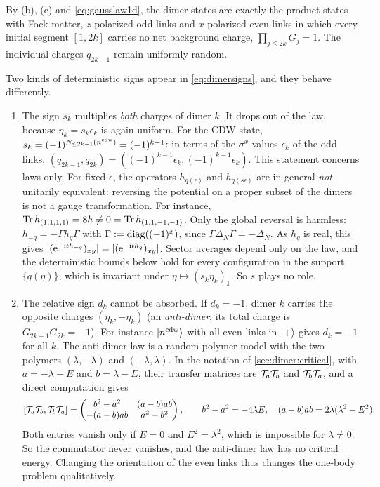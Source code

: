 By (b), (e) and \eqref{eq:gausslaw1d}, the dimer states are exactly the product states with Fock
matter, $z$-polarized odd links and $x$-polarized even links in which every initial segment $[1,2k]$
carries no net background charge, $\prod_{j\le2k}G_j=1$.  The individual charges $q_{2k-1}$ remain
uniformly random.

\begin{remark}\label{rem:dimersigns}
Two kinds of deterministic signs appear in \eqref{eq:dimersigns}, and they behave differently.
\begin{enumerate}[label=(\roman*)]
\item The sign $s_k$ multiplies \emph{both} charges of dimer $k$.  It drops out of the law, because
$\eta_k=s_k\epsilon_k$ is again uniform.  For the CDW state, $s_k=(-1)^{N_{\le2k-1}(n^{\mathrm{cdw}})}=(-1)^{k-1}$:
in terms of the $\sigma^x$-values $\epsilon_k$ of the odd links,
$(q_{2k-1},q_{2k})=((-1)^{k-1}\epsilon_k,(-1)^{k-1}\epsilon_k)$.  This statement concerns laws only.  For
fixed $\epsilon$, the operators $h_{q(\epsilon)}$ and $h_{q(s\epsilon)}$ are in general \emph{not} unitarily
equivalent: reversing the potential on a proper subset of the dimers is not a gauge transformation.
For instance, $\operatorname{Tr} h_{(1,1,1,1)}=8h\neq0=\operatorname{Tr} h_{(1,1,-1,-1)}$.  Only the global reversal is harmless:
$h_{-q}=-\Gamma h_q\Gamma$ with $\Gamma:=\operatorname{diag}((-1)^x)$, since $\Gamma\Delta_N\Gamma=-\Delta_N$.  As $h_q$
is real, this gives $|(\mathrm{e}^{-\mathrm{i} th_{-q}})_{xy}|=|(\mathrm{e}^{-\mathrm{i} th_q})_{xy}|$.  Sector averages depend only on
the law, and the deterministic bounds below hold for every configuration in the support
$\{q(\eta)\}$, which is invariant under $\eta\mapsto(s_k\eta_k)_k$.  So $s$ plays no role.
\item The relative sign $d_k$ cannot be absorbed.  If $d_k=-1$, dimer $k$ carries the opposite charges
$(\eta_k,-\eta_k)$ (an \emph{anti-dimer}; its total charge is $G_{2k-1}G_{2k}=-1$).  For instance
$|n^{\mathrm{cdw}}\rangle$ with all even links in $|+\rangle$ gives $d_k=-1$ for all $k$.  The anti-dimer law is a
random polymer model with the two polymers $(\lambda,-\lambda)$ and $(-\lambda,\lambda)$.  In the notation
of \cref{sec:dimer:critical}, with $a=-\lambda-E$ and $b=\lambda-E$, their transfer matrices are
$\mathcal{T}_a\mathcal{T}_b$ and $\mathcal{T}_b\mathcal{T}_a$, and a direct computation gives
\[
  [\mathcal{T}_a\mathcal{T}_b,\mathcal{T}_b\mathcal{T}_a]=\begin{pmatrix}b^2-a^2&(a-b)ab\\-(a-b)ab&a^2-b^2\end{pmatrix},\qquad
  b^2-a^2=-4\lambda E,\quad (a-b)ab=2\lambda(\lambda^2-E^2).
\]
Both entries vanish only if $E=0$ and $E^2=\lambda^2$, which is impossible for $\lambda\neq0$.  So the
commutator never vanishes, and the anti-dimer law has no critical energy.  Changing the
orientation of the even links thus changes the one-body problem qualitatively.
\end{enumerate}
\end{remark}

